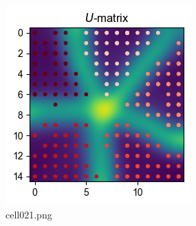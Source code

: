 \begin{figure}[ht]
	\centering
	\includegraphics[scale=0.8, max width=\linewidth]{./fig/local-learning-rule/self-organizing-map/cell021.png}
	\caption{cell021.png}
	\label{cell021.png}
\end{figure}